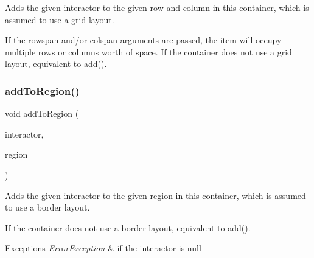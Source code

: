 Adds the given interactor to the given row and column in this container, which is assumed to use a grid layout. 

If the rowspan and/or colspan arguments are passed, the item will occupy multiple rows or columns\textquotesingle{} worth of space. If the container does not use a grid layout, equivalent to \mbox{\hyperlink{classsgl_1_1GContainer_a6f99b7c841256dbdc5acaafbbca4e685}{add()}}. \mbox{\label{classsgl_1_1GContainer_aab55413917cdbb2e0560ab415d59fd1f}} 
\subsubsection{\texorpdfstring{add\+To\+Region()}{addToRegion()}\hspace{0.1cm}{\footnotesize\ttfamily [1/4]}}
{\footnotesize\ttfamily void add\+To\+Region (\begin{DoxyParamCaption}\item[{\mbox{\hyperlink{classsgl_1_1GInteractor}{G\+Interactor}} $\ast$}]{interactor,  }\item[{\mbox{\hyperlink{classsgl_1_1GContainer_a81a01a86de31071a92e6cce0bab9bc4b}{Region}}}]{region }\end{DoxyParamCaption})\hspace{0.3cm}{\ttfamily [virtual]}}



Adds the given interactor to the given region in this container, which is assumed to use a border layout. 

If the container does not use a border layout, equivalent to \mbox{\hyperlink{classsgl_1_1GContainer_a6f99b7c841256dbdc5acaafbbca4e685}{add()}}. 
\begin{DoxyExceptions}{Exceptions}
{\em Error\+Exception} & if the interactor is null \\
\hline
\end{DoxyExceptions}
\mbox{\label{classsgl_1_1GContainer_a9c8e600889001e6e72d3548918a6baff}} 
